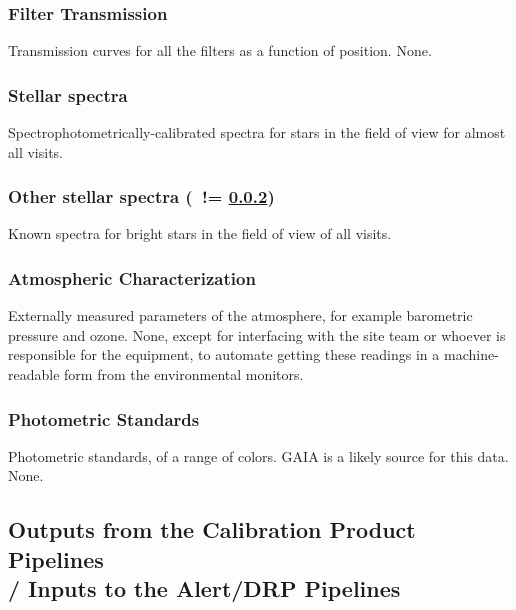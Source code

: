 \subsubsection{Filter Transmission}\label{sec:CPP:inputs:filterTransmission}
\cameraTeam
Transmission curves for all the filters as a function of position.
\alg None.


\subsubsection{Stellar spectra}\label{sec:CPP:inputs:starSpectrum} 
Spectrophotometrically-calibrated spectra for stars in the field of view for almost all visits.
\alg {}


\subsubsection{Other stellar spectra (\nb~!= \ref{sec:CPP:inputs:starSpectrum})}\label{sec:CPP:inputs:standardStarSpectrum}
Known spectra for bright stars in the field of view of all visits.
\alg {}


\subsubsection{Atmospheric Characterization}\label{sec:CPP:inputs:atmosphericData}
Externally measured parameters of the atmosphere, for example barometric pressure and ozone.
\alg None, except for interfacing with the site team or whoever is responsible for the equipment, to automate getting these readings in a machine-readable form from the environmental monitors.


\subsubsection{Photometric Standards}\label{sec:CPP:inputs:photometricStandards} 
Photometric standards, of a range of colors. GAIA is a likely source for this data.
\alg None.



\subsection{Outputs from the Calibration Product Pipelines \\
	/ Inputs to the Alert/DRP Pipelines}
\label{sec:CPP:output}

